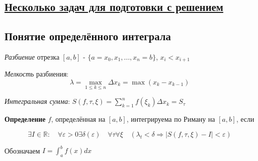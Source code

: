 \documentclass[a4paper]{article}
\begin{document}
\subsection*{\hyperlink{tasks}{Несколько задач для подготовки с решением}}

\newpage

\begin{definit}
\hypertarget{p1}{}
\subsection*{Понятие определённого интеграла}

\textit{Разбиение} отрезка $[a, b]$ - $\{ a = x_0, x_1, ..., x_n = b\}$, $x_i < x_{i+1}$

\textit{Мелкость} разбиения: $$\lambda = \max_{1 \leq k \leq n} \Delta x_k = \max (x_k - x_{k-1})$$

\textit{Интегральная сумма}: $S(f, \tau, \xi) = \sum_{k=1}^n f(\xi_k) \Delta x_k = S_\tau$

\textbf{Определение} $f$, определённая на $[a,b]$, интегрируема по Риману на $[a,b]$, если

$$\exists I \in \mathbb{R}: \quad \forall \varepsilon > 0 \exists \delta (\varepsilon) \quad \forall \tau  \forall \xi \quad (\lambda_t < \delta \Rightarrow |S(f, \tau, \xi) - I| < \varepsilon)$$

Обозначаем $I = \int_a^b f(x)dx$


\end{definit}
\end{document}
